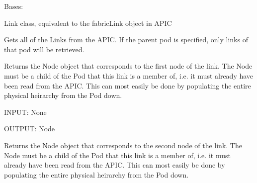 \documentclass[letterpaper,10pt,english]{sphinxmanual}
\begin{document}

\begin{fulllineitems}
\label{aciphysobject:aciphysobject.Link}
Bases: {\hyperref[aciphysobject:aciphysobject.BaseACIPhysObject]{}}

Link class, equivalent to the fabricLink object in APIC

\begin{fulllineitems}
\label{aciphysobject:aciphysobject.Link.get}
Gets all of the Links from the APIC.  If the parent pod is specified,
only links of that pod will be retrieved.

\end{fulllineitems}


\begin{fulllineitems}
\label{aciphysobject:aciphysobject.Link.get_linkstatus}
\end{fulllineitems}


\begin{fulllineitems}
\label{aciphysobject:aciphysobject.Link.get_node1}
Returns the Node object that corresponds to the first node of the link.  The Node must be a child of
the Pod that this link is a member of, i.e. it must already have been read from the APIC.  This can
most easily be done by populating the entire physical heirarchy from the Pod down.

INPUT: None

OUTPUT: Node

\end{fulllineitems}


\begin{fulllineitems}
\label{aciphysobject:aciphysobject.Link.get_node2}
Returns the Node object that corresponds to the second node of the link.  The Node must be a child of
the Pod that this link is a member of, i.e. it must already have been read from the APIC.  This can
most easily be done by populating the entire physical heirarchy from the Pod down.


\end{fulllineitems}
\end{fulllineitems}
\end{document}

